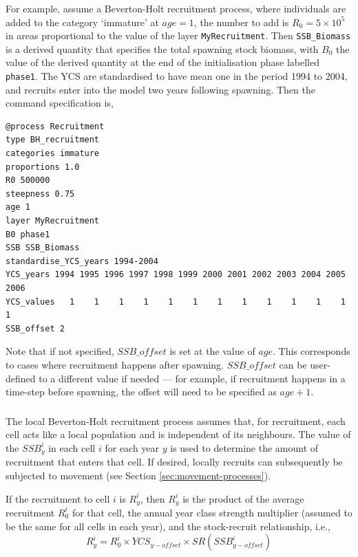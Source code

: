 For example, assume a Beverton-Holt recruitment process, where individuals are added to the category `immature' at $age=1$, the number to add is $R_0=5 \times 10^5$ in areas proportional to the value of the layer \texttt{MyRecruitment}. Then \texttt{SSB\_Biomass} is a derived quantity that specifies the total spawning stock biomass, with $B_0$ the value of the derived quantity at the end of the initialisation phase labelled \texttt{phase1}. The YCS are standardised to have mean one in the period 1994 to 2004, and recruits enter into the model two years following spawning. Then the command specification is,

{\small{\begin{verbatim}
@process Recruitment
type BH_recruitment
categories immature
proportions 1.0
R0 500000
steepness 0.75
age 1
layer MyRecruitment
B0 phase1
SSB SSB_Biomass
standardise_YCS_years 1994-2004
YCS_years 1994 1995 1996 1997 1998 1999 2000 2001 2002 2003 2004 2005 2006
YCS_values   1    1    1    1    1    1    1    1    1    1    1    1    1
SSB_offset 2
\end{verbatim}}}

Note that if not specified, $SSB\_offset$ is set at the value of $age$. This corresponds to cases where recruitment happens after spawning. $SSB\_offset$ can be user-defined to a different value if needed --- for example, if recruitment happens in a time-step before spawning, the offset will need to be specified as $age + 1$.

\subsubsection*{}

The local Beverton-Holt recruitment process assumes that, for recruitment, each cell acts like a local population and is independent of its neighbours. The value of the $SSB_y^i$ in each cell $i$ for each year $y$ is used to determine the amount of recruitment that enters that cell. If desired, locally recruits can subsequently be subjected to movement (see Section \ref{sec:movement-processes}).

If the recruitment to cell $i$ is $R_y^i$, then $R_y^i$ is the product of the average recruitment $R_0^i$ for that cell, the annual year class strength multiplier (assumed to be the same for all cells in each year), and the stock-recruit relationship, i.e., 
\begin{equation}
  R_y^i = R_0^i \times YCS_{y-offset} \times SR(SSB_{y-offset}^i)
\end{equation}

